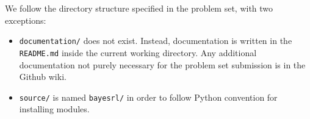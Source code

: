 \documentclass{pset}
\begin{document}

We follow the directory structure specified in the problem set, with two
exceptions:
\begin{itemize}
\item \texttt{documentation/} does not exist. Instead, documentation is written
in the \texttt{README.md} inside the current working directory. Any additional
documentation not purely necessary for the problem set submission is in the
Github wiki.
\item \texttt{source/} is named \texttt{bayesrl/} in order to follow Python
convention for installing modules.
\end{itemize}

\end{document}
